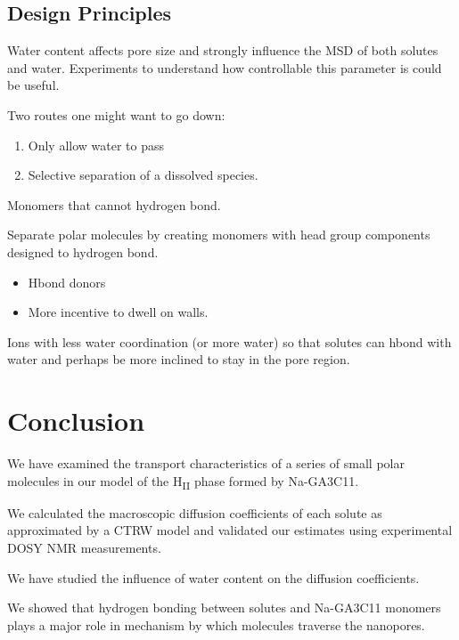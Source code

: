 \documentclass{article}
\begin{document}

  \subsection{Design Principles}

  Water content affects pore size and strongly influence the MSD of both solutes and
  water. Experiments to understand how controllable this parameter is could be useful.
  
  Two routes one might want to go down:
  \begin{enumerate}
    \item Only allow water to pass
    \item Selective separation of a dissolved species.
  \end{enumerate}
  
  Monomers that cannot hydrogen bond. %

  Separate polar molecules by creating monomers with head group components designed to
  hydrogen bond.
  \begin{itemize}
  	\item Hbond donors
	\item More incentive to dwell on walls.
  \end{itemize}
  
  Ions with less water coordination (or more water) so that solutes can hbond with water
  and perhaps be more inclined to stay in the pore region.

  \section{Conclusion}

  We have examined the transport characteristics of a series of small polar
  molecules in our model of the H\textsubscript{II} phase formed by 
  Na-GA3C11.

  We calculated the macroscopic diffusion coefficients of each solute as 
  approximated by a CTRW model and validated our estimates using experimental
  DOSY NMR measurements.

  We have studied the influence of water content on the diffusion coefficients.

  We showed that hydrogen bonding between solutes and Na-GA3C11 monomers plays
  a major role in mechanism by which molecules traverse the nanopores. 
\end{document}
